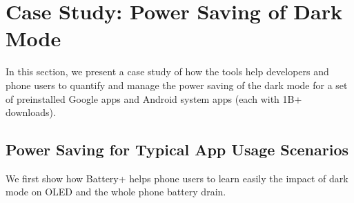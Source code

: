 \section{Case Study: Power Saving of Dark Mode}
\label{sec:casedark}



In this section, we present a case study of
how the tools help developers and phone users to quantify and manage
the power saving of the dark mode for a set of preinstalled
Google apps and Android system apps (each with 1B+ downloads).



\subsection{Power Saving for Typical App Usage Scenarios}
\label{subsec:mainresults}

We first show how Battery+ helps phone users to learn easily the
impact of dark mode on OLED and the whole phone battery drain.

